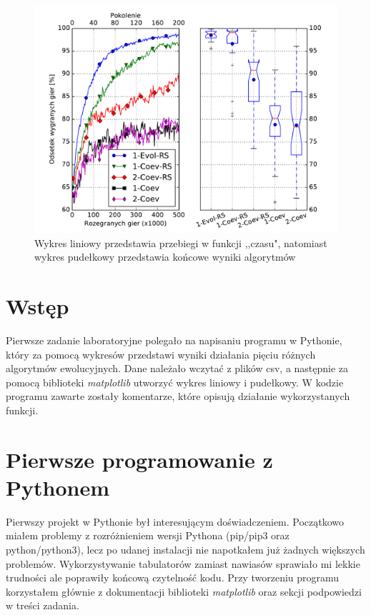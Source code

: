 \documentclass{article}
\begin{document}


\begin{figure}
\begin{center}
\includegraphics[width=1.0\textwidth]{wykresy.pdf}
\end{center}
\caption{Wykres liniowy przedstawia przebiegi w funkcji ,,czasu", natomiast wykres pudełkowy przedstawia końcowe wyniki algorytmów}
\label{fig:schemat}
\end{figure}


\section{Wstęp}

Pierwsze zadanie laboratoryjne polegało na napisaniu programu w Pythonie, który za pomocą wykresów przedstawi wyniki działania pięciu różnych algorytmów ewolucyjnych. Dane należało wczytać z plików csv, a następnie za pomocą biblioteki \textit{matplotlib} utworzyć wykres liniowy i pudełkowy. W kodzie programu zawarte zostały komentarze, które opisują działanie wykorzystanych funkcji.

\section{Pierwsze programowanie z Pythonem}

Pierwszy projekt w Pythonie był interesującym doświadczeniem. Początkowo miałem problemy z rozróżnieniem wersji Pythona (pip/pip3 oraz python/python3), lecz po udanej instalacji nie napotkałem już żadnych większych problemów. Wykorzystywanie tabulatorów zamiast nawiasów sprawiało mi lekkie trudności ale poprawiły końcową czytelność kodu. Przy tworzeniu programu korzystałem głównie z dokumentacji biblioteki \textit{matplotlib} oraz sekcji podpowiedzi w treści zadania. 
\end{document}
